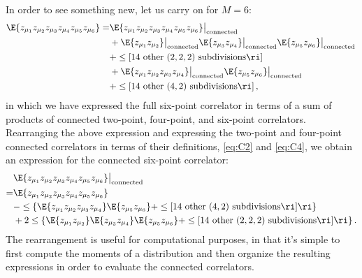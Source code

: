 In order to see something new, let us carry on for $M=6$:
\begin{align}\label{eq:six-point-moment-in-terms-of-connected}
\E{z_{\mu_1} z_{\mu_2}z_{\mu_3}z_{\mu_4}z_{\mu_5}z_{\mu_6}}=&\E{z_{\mu_1} z_{\mu_2}z_{\mu_3}z_{\mu_4}z_{\mu_5}z_{\mu_6}}\big|_{\text{connected}}\, \\
&+\E{z_{\mu_1} z_{\mu_2}}\big|_{\text{connected}}\E{z_{\mu_3} z_{\mu_4}}\big|_{\text{connected}}\E{z_{\mu_5} z_{\mu_6}}\big|_{\text{connected}}\, \nonumber\\
&+\le[14 \ \text{other}\ (2,2,2)\ \text{subdivisions}\ri]\, \nonumber\\
&+\E{z_{\mu_1} z_{\mu_2}z_{\mu_3} z_{\mu_4}}\big|_{\text{connected}}\E{z_{\mu_5} z_{\mu_6}}\big|_{\text{connected}}\, \nonumber\\
&+\le[14 \ \text{other}\ (4,2)\ \text{subdivisions}\ri]\, ,\nonumber
\end{align}
in which we have expressed the full six-point correlator in terms of a sum of products of connected two-point, four-point, and six-point correlators.
Rearranging the above expression and expressing the two-point and four-point connected correlators in terms of their definitions,  \eqref{eq:C2} and \eqref{eq:C4}, we obtain an expression for the connected six-point correlator:
\begin{align}\label{eq:C6}
&\E{z_{\mu_1} z_{\mu_2}z_{\mu_3}z_{\mu_4}z_{\mu_5}z_{\mu_6}}\big|_{\text{connected}}\, \\
=&\E{z_{\mu_1} z_{\mu_2}z_{\mu_3}z_{\mu_4}z_{\mu_5}z_{\mu_6}}\,\nonumber\\
&-\le\{\E{z_{\mu_1} z_{\mu_2}z_{\mu_3} z_{\mu_4}}\E{z_{\mu_5}z_{\mu_6}}+\le[14 \ \text{other}\ (4,2)\ \text{subdivisions}\ri]\ri\}\, \nonumber\\
&+2\le\{\E{z_{\mu_1} z_{\mu_2}}\E{z_{\mu_3} z_{\mu_4}}\E{z_{\mu_5} z_{\mu_6}}+\le[14 \ \text{other}\ (2,2,2)\ \text{subdivisions}\ri]\ri\}\, .\nonumber
\end{align}
The rearrangement is useful for computational purposes, in that it's simple to first compute the moments of a distribution and then organize the resulting expressions in order to evaluate the connected correlators.

